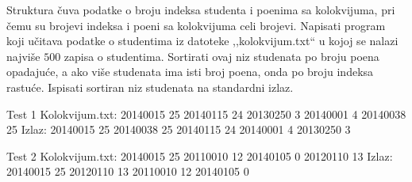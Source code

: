 \begin{Exercise}[label=312]
Struktura  čuva podatke o broju
indeksa studenta i poenima sa kolokvijuma, pri čemu su
brojevi indeksa i poeni sa kolokvijuma celi brojevi. Napisati
program koji učitava podatke o studentima iz datoteke
,,kolokvijum.txt`` u kojoj se nalazi najviše $500$ zapisa
o studentima. Sortirati ovaj niz studenata po broju poena
opadajuće, a ako više studenata ima isti broj poena, onda po
broju indeksa rastuće. Ispisati sortiran niz studenata na
standardni izlaz.

\begin{miditest}
\begin{test}{Test 1}
Kolokvijum.txt:   20140015 25
                  20140115 24
                  20130250 3
                  20140001 4
                  20140038 25
Izlaz:            20140015 25
                  20140038 25
                  20140115 24
                  20140001 4
                  20130250 3
\end{test}
\end{miditest}
\begin{miditest}
\begin{test}{Test 2}
Kolokvijum.txt:   20140015 25
                  20110010 12
                  20140105 0
                  20120110 13
Izlaz:            20140015 25
                  20120110 13
                  20110010 12
                  20140105 0
\end{test}
\end{miditest}
\end{Exercise}
\begin{Answer}[ref=312]
\end{Answer}

